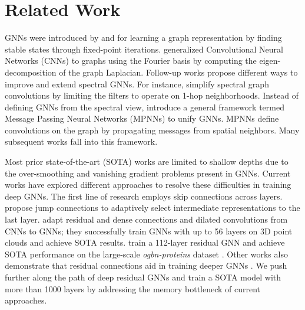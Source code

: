 \documentclass{article}
\begin{document}
\section{Related Work}
\label{sec:related}
GNNs were introduced by \citet{gori2005new} and \citet{scarselli2008graph} for learning a graph representation by finding stable states through fixed-point iterations. \citet{bruna2013spectral} generalized Convolutional Neural Networks (CNNs) to graphs using the Fourier basis by computing the eigen-decomposition of the graph Laplacian. 
Follow-up works \citep{ henaff2015deep,defferrard2016convolutional, kipf2017semi,levie2018cayleynets, li2018adaptive} propose different ways to improve and extend spectral GNNs. For instance, \citet{kipf2017semi} simplify spectral graph convolutions by limiting the filters to operate on 1-hop neighborhoods. Instead of defining GNNs from the spectral view, \citet{gilmer2017neural} introduce a general framework termed Message Passing Neural Networks (MPNNs) to unify GNNs. MPNNs define convolutions on the graph by propagating messages from spatial neighbors. Many subsequent works \citep{hamilton2017inductive, monti2017geometric, niepert2016learning, gao2018large, xu2018powerful, veli2018gat, wang2019dynamic} fall into this framework.

Most prior state-of-the-art (SOTA) works are limited to shallow depths due to the over-smoothing \citep{li2018deeper} and vanishing gradient problems \citep{li2019deepgcns,li2021deepgcns_pami} present in GNNs. Current works have explored different approaches to resolve these difficulties in training deep GNNs. The first line of research employs skip connections across layers. \citet{xu2018jknet} propose jump connections to adaptively select intermediate representations to the last layer. \citet{li2019deepgcns} adapt residual and dense connections \citep{he2016deep, huang2017densely} and dilated convolutions \citep{YuKoltun2016} from CNNs to GNNs; they successfully train GNNs with up to 56 layers on 3D point clouds and achieve SOTA results. \citet{li2020deepergcn} train a 112-layer residual GNN and achieve SOTA performance on the large-scale \emph{ogbn-proteins}  dataset \citep{hu2020open}. 
Other works also demonstrate that residual connections aid in training deeper GNNs \citep{gong2020geometrically,chen2020simple,xu2021optimization}.
We push further along the path of deep residual GNNs and train a SOTA model with more than 1000 layers by addressing the memory bottleneck of current approaches.
\end{document}
